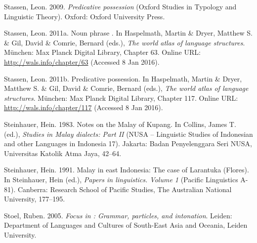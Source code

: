 \begin{styleCitaviBibliographyEntry}
Stassen, Leon. 2009. \textit{Predicative possession} (Oxford Studies in Typology and Linguistic Theory). Oxford: Oxford University Press.
\end{styleCitaviBibliographyEntry}

\begin{styleCitaviBibliographyEntry}
Stassen, Leon. 2011a. Noun phrase . In Haspelmath, Martin \& Dryer, Matthew S. \& Gil, David \& Comrie, Bernard (eds.), \textit{The world atlas of language structures}. München: Max Planck Digital Library, Chapter 63. Online URL: \url{http://wals.info/chapter/63} (Accessed 8 Jan 2016).
\end{styleCitaviBibliographyEntry}

\begin{styleCitaviBibliographyEntry}
Stassen, Leon. 2011b. Predicative possession. In Haspelmath, Martin \& Dryer, Matthew S. \& Gil, David \& Comrie, Bernard (eds.), \textit{The world atlas of language structures}. München: Max Planck Digital Library, Chapter 117. Online URL: \url{http://wals.info/chapter/117} (Accessed 8 Jan 2016).
\end{styleCitaviBibliographyEntry}

\begin{styleCitaviBibliographyEntry}
Steinhauer, Hein. 1983. Notes on the Malay of Kupang. In Collins, James T. (ed.), \textit{Studies in Malay dialects: Part II} (NUSA – Linguistic Studies of Indonesian and other Languages in Indonesia 17). Jakarta: Badan Penyelenggara Seri NUSA, Universitas Katolik Atma Jaya, 42–64.
\end{styleCitaviBibliographyEntry}

\begin{styleCitaviBibliographyEntry}
Steinhauer, Hein. 1991. Malay in east Indonesia: The case of Larantuka (Flores). In Steinhauer, Hein (ed.), \textit{Papers in  linguistics. Volume 1} (Pacific Linguistics A-81). Canberra: Research School of Pacific Studies, The Australian National University, 177–195.
\end{styleCitaviBibliographyEntry}

\begin{styleCitaviBibliographyEntry}
Stoel, Ruben. 2005. \textit{Focus in : Grammar, particles, and intonation}. Leiden: Department of Languages and Cultures of South-East Asia and Oceania, Leiden University.
\end{styleCitaviBibliographyEntry}


